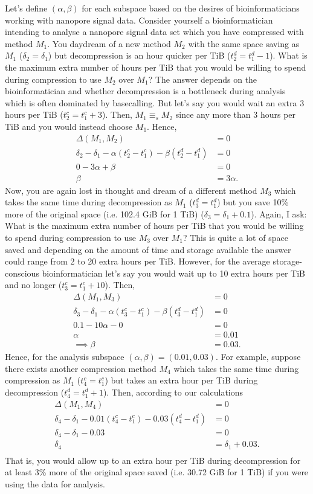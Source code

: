 Let's define $(\alpha,\beta)$ for each subspace based on the desires of
bioinformaticians working with nanopore signal data. Consider yourself a
bioinformatician intending to analyse a nanopore signal data set which you have
compressed with method $M_1$. You daydream of a new method $M_2$ with the same
space saving as $M_1$ ($\delta_2=\delta_1$) but decompression is an hour quicker
per TiB ($t^d_2=t^d_1-1$). What is the maximum extra number of hours per TiB
that you would be willing to spend during compression to use $M_2$ over $M_1$?
The answer depends on the bioinformatician and whether decompression is a
bottleneck during analysis which is often dominated by basecalling. But let's
say you would wait an extra 3 hours per TiB ($t^c_2=t^c_1+3$). Then,
$M_1\equiv_sM_2$ since any more than 3 hours per TiB and you would instead
choose $M_1$. Hence,
\begin{align*}
	\Delta(M_1,M_2)&=0\\
	\delta_2-\delta_1-\alpha(t^c_2-t^c_1) - \beta(t^d_2-t^d_1) &= 0\\
	0-3\alpha + \beta &= 0\\
	\beta &= 3\alpha.
\end{align*}
Now, you are again lost in thought and dream of a different method $M_3$ which
takes the same time during decompression as $M_1$ ($t^d_3=t^d_1$) but you save
10\% more of the original space (i.e. 102.4 GiB for 1 TiB) ($\delta_3=\delta_1+0.1$).
Again, I ask:
What is the maximum extra number of hours per TiB that you would be willing to
spend during compression to use $M_3$ over $M_1$? This is quite a lot of space
saved and depending on the amount of time and storage available the answer could
range from 2 to 20 extra hours per TiB. However, for the average
storage-conscious bioinformatician let's say you would wait up to 10 extra hours
per TiB and no longer ($t^c_3=t^c_1+10$). Then,
\begin{align*}
	\Delta(M_1,M_3)&=0\\
	\delta_3-\delta_1 - \alpha(t^c_3-t^c_1) - \beta(t^d_3-t^d_1) &= 0\\
	0.1 - 10\alpha - 0 &=0\\
	\alpha&=0.01\\
	\implies \beta&=0.03.
\end{align*}
Hence, for the analysis subspace $(\alpha,\beta)=(0.01,0.03)$. For example,
suppose there exists another compression method $M_4$ which takes the same time
during compression as $M_1$ ($t_4^c=t_1^c$) but takes an extra hour per TiB
during decompression ($t_4^d=t_1^d+1$). Then, according to our calculations
\begin{align*}
	\Delta(M_1,M_4)&=0\\
	\delta_4-\delta_1 - 0.01(t^c_4-t^c_1) - 0.03(t^d_4-t^d_1) &= 0\\
	\delta_4-\delta_1 - 0.03 &= 0\\
	\delta_4&=\delta_1 + 0.03.\\
\end{align*}
That is, you would allow up to an extra hour per TiB during decompression for at
least 3\% more of the original space saved (i.e. 30.72 GiB for 1 TiB) if you were
using the data for analysis.

